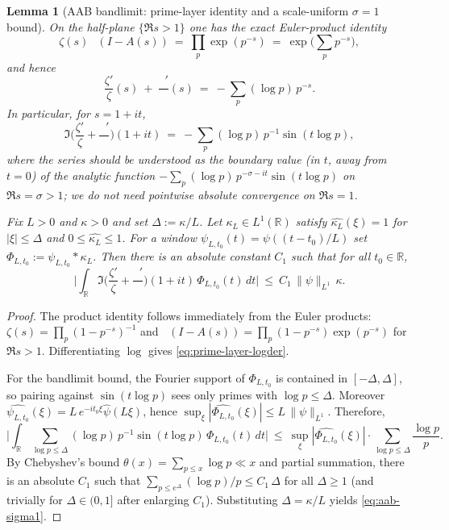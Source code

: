 \documentclass[11pt]{article}
\newtheorem{lemma}[theorem]{Lemma}
\theoremstyle{definition}
\theoremstyle{remark}
\theoremstyle{definition}
\newcommand{\R}{\mathbb{R}}
\DeclareMathOperator{\dettwo}{det_2}
\begin{document}
\begin{lemma}[AAB bandlimit: prime-layer identity and a scale-uniform $\sigma=1$ bound]\label{lem:aab-bandlimit-prime}
On the half-plane $\{\Re s>1\}$ one has the exact Euler-product identity
\[
  \zeta(s)\,\dettwo(I-A(s))\ =\ \prod_{p}\exp(p^{-s})\ =\ \exp\!\Big(\sum_{p}p^{-s}\Big),
\]
and hence
\begin{equation}\label{eq:prime-layer-logder}
  \frac{\zeta'}{\zeta}(s)\ +\ \frac{\dettwo'}{\dettwo}(s)\ =\ -\sum_{p}(\log p)\,p^{-s}.
\end{equation}
In particular, for $s=1+it$,
\[
  \Im\!\Big(\frac{\zeta'}{\zeta}+\frac{\dettwo'}{\dettwo}\Big)(1+it)
  \ =\ -\sum_{p}(\log p)\,p^{-1}\sin(t\log p),
\]
where the series should be understood as the boundary value (in $t$, away from $t=0$) of the analytic function
$-\sum_p (\log p)\,p^{-\sigma-it}\sin(t\log p)$ on $\Re s=\sigma>1$; we do not need pointwise absolute convergence on $\Re s=1$.

Fix $L>0$ and $\kappa>0$ and set $\Delta:=\kappa/L$.
Let $\kappa_L\in L^1(\R)$ satisfy $\widehat{\kappa_L}(\xi)=1$ for $|\xi|\le \Delta$ and $0\le \widehat{\kappa_L}\le 1$.
For a window $\psi_{L,t_0}(t)=\psi((t-t_0)/L)$ set $\Phi_{L,t_0}:=\psi_{L,t_0}*\kappa_L$.
Then there is an absolute constant $C_1$ such that for all $t_0\in\R$,
\begin{equation}\label{eq:aab-sigma1}
  \Bigg|\int_{\R}\Im\!\Big(\frac{\zeta'}{\zeta}+\frac{\dettwo'}{\dettwo}\Big)(1+it)\,\Phi_{L,t_0}(t)\,dt\Bigg|
  \ \le\ C_1\,\|\psi\|_{L^1}\,\kappa.
\end{equation}
\end{lemma}
\begin{proof}
The product identity follows immediately from the Euler products:
$\zeta(s)=\prod_p(1-p^{-s})^{-1}$ and $\dettwo(I-A(s))=\prod_p(1-p^{-s})\exp(p^{-s})$ for $\Re s>1$.
Differentiating $\log$ gives \eqref{eq:prime-layer-logder}.

For the bandlimit bound, the Fourier support of $\Phi_{L,t_0}$ is contained in $[-\Delta,\Delta]$, so pairing against $\sin(t\log p)$ sees only primes with $\log p\le \Delta$.
Moreover $\widehat{\psi_{L,t_0}}(\xi)=L\,e^{-it_0\xi}\widehat{\psi}(L\xi)$, hence $\sup_\xi |\widehat{\Phi_{L,t_0}}(\xi)|\le L\,\|\psi\|_{L^1}$.
Therefore,
\[
  \Bigg|\int_{\R}\sum_{\log p\le \Delta}(\log p)\,p^{-1}\sin(t\log p)\,\Phi_{L,t_0}(t)\,dt\Bigg|
  \ \le\ \sup_\xi |\widehat{\Phi_{L,t_0}}(\xi)|\cdot \sum_{\log p\le \Delta}\frac{\log p}{p}.
\]
By Chebyshev's bound $\theta(x)=\sum_{p\le x}\log p\ll x$ and partial summation, there is an absolute $C_1$ such that
$\sum_{p\le e^\Delta}(\log p)/p\le C_1\,\Delta$ for all $\Delta\ge 1$ (and trivially for $\Delta\in(0,1]$ after enlarging $C_1$).
Substituting $\Delta=\kappa/L$ yields \eqref{eq:aab-sigma1}.
\end{proof}
\end{document}
